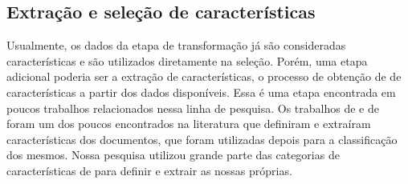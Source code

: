 \documentclass[template.tex]{subfiles}
\begin{document}
\subsection{Extração e seleção de características}


%
%
%
%
%



Usualmente, os dados da etapa de transformação já são consideradas características e são utilizados diretamente na seleção. Porém, uma etapa adicional poderia ser a extração de características, o processo de obtenção de  de características a partir dos dados disponíveis. Essa é uma etapa encontrada em poucos trabalhos relacionados nessa linha de pesquisa.  Os trabalhos de  e de  foram um dos poucos encontrados na literatura que definiram e extraíram características dos documentos, que foram utilizadas depois para a classificação dos mesmos.
Nossa pesquisa utilizou grande parte das categorias de características de  para definir e extrair as nossas próprias.
\end{document}

